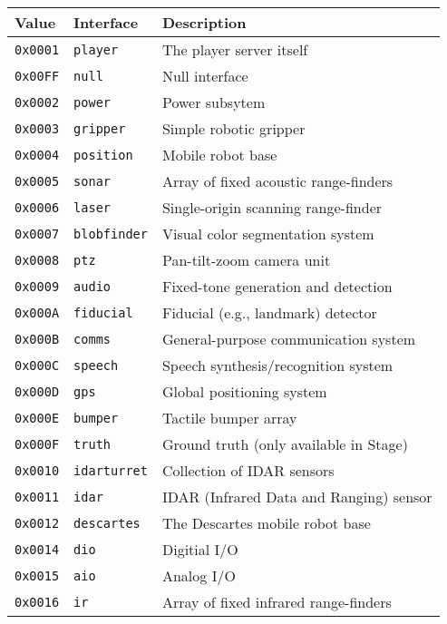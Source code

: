 \documentclass[11pt]{report}
\begin{document}
\begin{itemize}
\begin{table}[ht]
\begin{center}
{\small
\begin{tabular}{|l|l|l|}
\hline
{\bf Value} & {\bf Interface} & {\bf Description} \\
\hline
{\tt 0x0001} & {\tt player} & The player server itself \\
\hline
{\tt 0x00FF} & {\tt null} & Null interface \\
\hline
{\tt 0x0002} & {\tt power} & Power subsytem \\
\hline
{\tt 0x0003} & {\tt gripper} & Simple robotic gripper \\
\hline
{\tt 0x0004} & {\tt position} & Mobile robot base \\
\hline
{\tt 0x0005} & {\tt sonar} & Array of fixed acoustic range-finders\\
\hline
{\tt 0x0006} & {\tt laser} & Single-origin scanning range-finder\\
\hline
{\tt 0x0007} & {\tt blobfinder} & Visual color segmentation system\\
\hline
{\tt 0x0008} & {\tt ptz} & Pan-tilt-zoom camera unit \\
\hline
{\tt 0x0009} & {\tt audio} & Fixed-tone generation and detection\\
\hline
{\tt 0x000A} & {\tt fiducial} & Fiducial (e.g., landmark) detector \\
\hline
{\tt 0x000B} & {\tt comms} & General-purpose communication system\\
\hline
{\tt 0x000C} & {\tt speech} & Speech synthesis/recognition system\\
\hline
{\tt 0x000D} & {\tt gps} & Global positioning system\\
\hline
{\tt 0x000E} & {\tt bumper} & Tactile bumper array\\
\hline
{\tt 0x000F} & {\tt truth} & Ground truth (only available in Stage) \\
\hline
{\tt 0x0010} & {\tt idarturret} & Collection of IDAR sensors\\
\hline
{\tt 0x0011} & {\tt idar} & IDAR (Infrared Data and Ranging) sensor\\
\hline
{\tt 0x0012} & {\tt descartes} & The Descartes mobile robot base\\
\hline
{\tt 0x0014} & {\tt dio} & Digitial I/O\\
\hline
{\tt 0x0015} & {\tt aio} & Analog I/O\\
\hline
{\tt 0x0016} & {\tt ir} & Array of fixed infrared range-finders \\

\end{tabular}}
\end{center}
\end{table}
\end{itemize}
\end{document}
